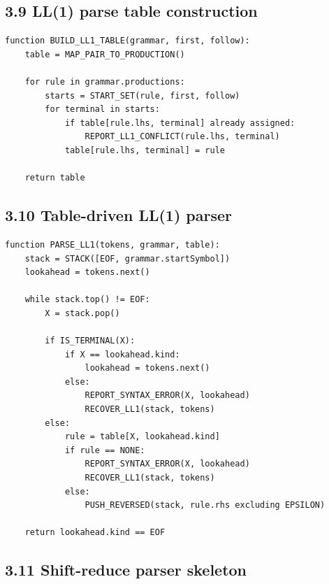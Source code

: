 \documentclass[10pt,letterpaper]{article}
\begin{document}
\subsection*{3.9 LL(1) parse table construction}

\begin{verbatim}
function BUILD_LL1_TABLE(grammar, first, follow):
    table = MAP_PAIR_TO_PRODUCTION()

    for rule in grammar.productions:
        starts = START_SET(rule, first, follow)
        for terminal in starts:
            if table[rule.lhs, terminal] already assigned:
                REPORT_LL1_CONFLICT(rule.lhs, terminal)
            table[rule.lhs, terminal] = rule

    return table
\end{verbatim}

\subsection*{3.10 Table-driven LL(1) parser}

\begin{verbatim}
function PARSE_LL1(tokens, grammar, table):
    stack = STACK([EOF, grammar.startSymbol])
    lookahead = tokens.next()

    while stack.top() != EOF:
        X = stack.pop()

        if IS_TERMINAL(X):
            if X == lookahead.kind:
                lookahead = tokens.next()
            else:
                REPORT_SYNTAX_ERROR(X, lookahead)
                RECOVER_LL1(stack, tokens)
        else:
            rule = table[X, lookahead.kind]
            if rule == NONE:
                REPORT_SYNTAX_ERROR(X, lookahead)
                RECOVER_LL1(stack, tokens)
            else:
                PUSH_REVERSED(stack, rule.rhs excluding EPSILON)

    return lookahead.kind == EOF
\end{verbatim}

\subsection*{3.11 Shift-reduce parser skeleton}
\end{document}
